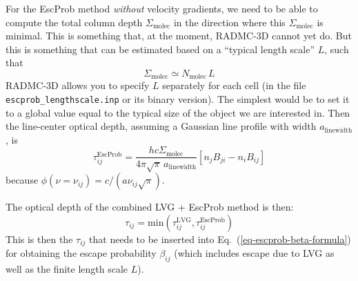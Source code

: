 \documentclass{report}
\begin{document}
For the EscProb method {\em without} velocity gradients, we need to be
able to compute the total column depth $\Sigma_{\mathrm{molec}}$ in the
direction where this $\Sigma_{\mathrm{molec}}$ is minimal. This is something
that, at the moment, RADMC-3D cannot yet do. But this is something that can
be estimated based on a ``typical length scale'' $L$, such that
 \begin{equation}
\Sigma_{\mathrm{molec}} \simeq N_{\mathrm{molec}}\, L
\end{equation}
RADMC-3D allows you to specify $L$ separately for each cell (in the file
{\small\tt escprob\_lengthscale.inp} or its binary version). The
simplest would be to set it to a global value equal to the typical size of
the object we are interested in. Then the line-center optical depth,
assuming a Gaussian line profile with width $a_{\mathrm{linewidth}}$, is
\begin{equation}
\tau_{ij}^{\mathrm{EscProb}} = \frac{hc \Sigma_{\mathrm{molec}}}{4\pi\sqrt{\pi}\,a_{\mathrm{linewidth}}}\left[n_jB_{ji}-n_iB_{ij}\right]
\end{equation}
because $\phi(\nu=\nu_{ij})=c/(a\nu_{ij}\sqrt{\pi})$. 

The optical depth of the combined LVG + EscProb method is then:
\begin{equation}
\tau_{ij} = \mathrm{min}\left(\tau_{ij}^{\mathrm{LVG}},\tau_{ij}^{\mathrm{EscProb}}\right)
\end{equation}
This is then the $\tau_{ij}$ that needs to be inserted into
Eq.~(\ref{eq-escprob-beta-formula}) for obtaining the escape probability
$\beta_{ij}$ (which includes escape due to LVG as well as the finite
length scale $L$).
\end{document}
